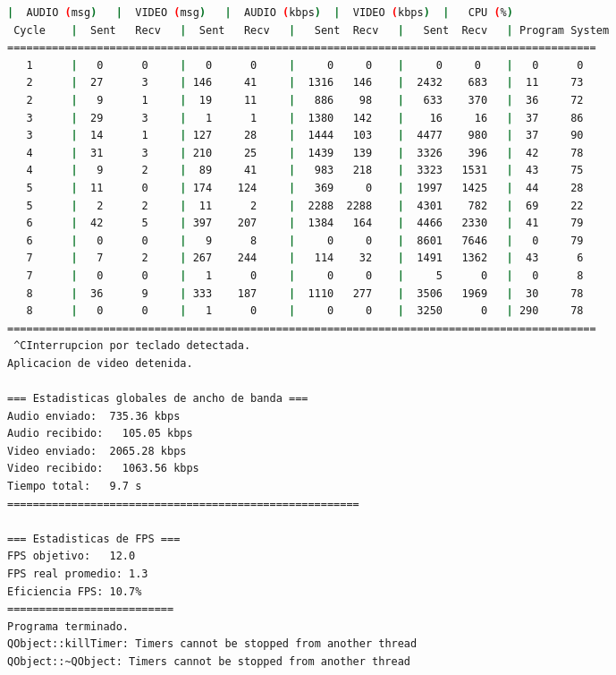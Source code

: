 \begin{adjustbox}{max width=\textwidth}
\begin{lstlisting}[language=bash,basicstyle=\ttfamily\scriptsize]
          |  AUDIO (msg)   |  VIDEO (msg)   |  AUDIO (kbps)  |  VIDEO (kbps)  |   CPU (%)
 Cycle    |  Sent   Recv   |  Sent   Recv   |   Sent  Recv   |   Sent  Recv   | Program System
============================================================================================
   1      |   0      0     |   0      0     |     0     0    |     0     0    |   0      0
   2      |  27      3     | 146     41     |  1316   146    |  2432    683   |  11     73
   2      |   9      1     |  19     11     |   886    98    |   633    370   |  36     72
   3      |  29      3     |   1      1     |  1380   142    |    16     16   |  37     86
   3      |  14      1     | 127     28     |  1444   103    |  4477    980   |  37     90
   4      |  31      3     | 210     25     |  1439   139    |  3326    396   |  42     78
   4      |   9      2     |  89     41     |   983   218    |  3323   1531   |  43     75
   5      |  11      0     | 174    124     |   369     0    |  1997   1425   |  44     28
   5      |   2      2     |  11      2     |  2288  2288    |  4301    782   |  69     22
   6      |  42      5     | 397    207     |  1384   164    |  4466   2330   |  41     79
   6      |   0      0     |   9      8     |     0     0    |  8601   7646   |   0     79
   7      |   7      2     | 267    244     |   114    32    |  1491   1362   |  43      6
   7      |   0      0     |   1      0     |     0     0    |     5      0   |   0      8
   8      |  36      9     | 333    187     |  1110   277    |  3506   1969   |  30     78
   8      |   0      0     |   1      0     |     0     0    |  3250      0   | 290     78
============================================================================================
 ^CInterrupcion por teclado detectada.
Aplicacion de video detenida.

=== Estadisticas globales de ancho de banda ===
Audio enviado:	735.36 kbps
Audio recibido:   105.05 kbps
Video enviado:	2065.28 kbps
Video recibido:   1063.56 kbps
Tiempo total: 	9.7 s
=======================================================

=== Estadisticas de FPS ===
FPS objetivo: 	12.0
FPS real promedio: 1.3
Eficiencia FPS:	10.7%
==========================
Programa terminado.
QObject::killTimer: Timers cannot be stopped from another thread
QObject::~QObject: Timers cannot be stopped from another thread
\end{lstlisting}
\end{adjustbox}
\vspace{\baselineskip}


